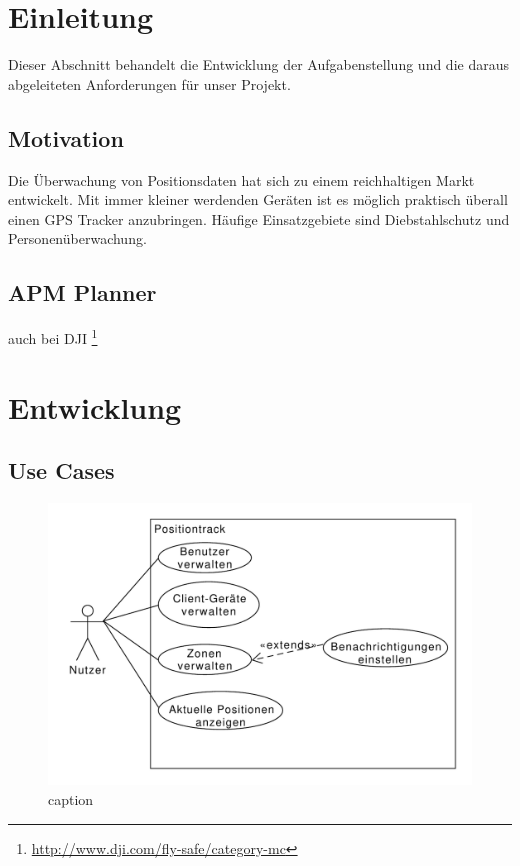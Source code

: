 \documentclass[
    11pt,               %
    a4paper,            %
    headsepline,        %
    foodsepline,        %
    cleardoubleplain,   %
    liststotoc,         %
    bibtotoc,           %
]%
{article}
\begin{document}
\pagestyle{empty}


\tableofcontents
\thispagestyle{empty}

\newpage
\pagestyle{empty}
\listoffigures

\newpage
\listoftables

\newpage
\pagestyle{plain}
\setcounter{section}{0}

%
\section{Einleitung}
Dieser Abschnitt behandelt die Entwicklung der Aufgabenstellung und die daraus abgeleiteten Anforderungen für unser Projekt.

\subsection{Motivation}
Die Überwachung von Positionsdaten hat sich zu einem reichhaltigen Markt entwickelt. Mit immer kleiner werdenden Geräten ist es möglich praktisch überall einen GPS Tracker anzubringen. Häufige Einsatzgebiete sind Diebstahlschutz und Personenüberwachung. 

\subsection{APM Planner}
auch bei DJI \footnote{\url{http://www.dji.com/fly-safe/category-mc}}


\section{Entwicklung}

\subsection{Use Cases}
\begin{figure}
\includegraphics[scale=1]{images/useCaseDiagram.pdf}
\caption{caption}
\end{figure}
\end{document}
